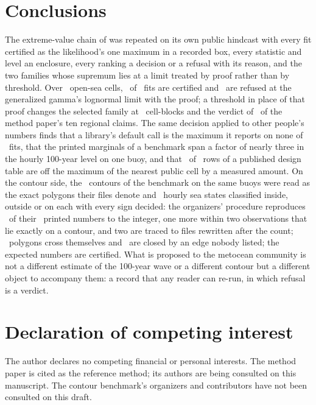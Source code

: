 \documentclass[preprint,11pt,authoryear]{elsarticle}
\begin{document}
\section{Conclusions}\label{sec:conclusions}
The extreme-value chain of \citet{reis2026} was repeated on its own public hindcast with every fit certified as the likelihood's one maximum in a recorded box, every statistic and level an enclosure, every ranking a decision or a refusal with its reason, and the two families whose supremum lies at a limit treated by proof rather than by threshold. Over \ACells\ open-sea cells, \ACertified\ of \AFits\ fits are certified and \AGGLimit\ are refused at the generalized gamma's lognormal limit with the proof; a threshold in place of that proof changes the selected family at \ANaiveDiff\ cell-blocks and the verdict of \AClaimsMoved\ of the method paper's ten regional claims. The same decision applied to other people's numbers finds that a library's default call is the maximum it reports on none of \SFits\ fits, that the printed marginals of a benchmark span a factor of nearly three in the hourly 100-year level on one buoy, and that \TOff\ of \TRows\ rows of a published design table are off the maximum of the nearest public cell by a measured amount. On the contour side, the \EContours\ contours of the benchmark on the same buoys were read as the exact polygons their files denote and \EHoursTotal\ hourly sea states classified inside, outside or on each with every sign decided: the organizers' procedure reproduces \EExact\ of their \EComparisons\ printed numbers to the integer, one more within two observations that lie exactly on a contour, and two are traced to files rewritten after the count; \ENotSimple\ polygons cross themselves and \ENotClosed\ are closed by an edge nobody listed; the expected numbers are certified. What is proposed to the metocean community is not a different estimate of the 100-year wave or a different contour but a different object to accompany them: a record that any reader can re-run, in which refusal is a verdict.

\section*{Declaration of competing interest}
The author declares no competing financial or personal interests. The method paper is cited as the reference method; its authors are being consulted on this manuscript. The contour benchmark's organizers and contributors have not been consulted on this draft.
\end{document}
